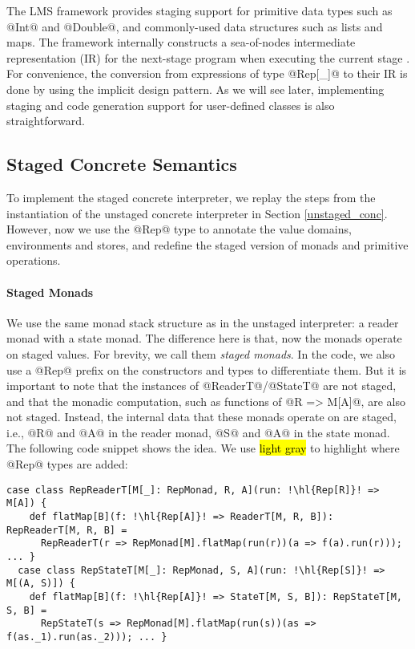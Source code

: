 The LMS framework provides staging support for primitive data types such as
@Int@ and @Double@, and commonly-used data structures such as lists and maps.
The framework internally constructs a sea-of-nodes intermediate representation (IR)
for the next-stage program when executing the current stage \cite{DBLP:conf/birthday/Rompf16}.
For convenience, the conversion from expressions of type @Rep[_]@ to their IR
is done by using the implicit design pattern. As we will see later,
implementing staging and code generation support for user-defined classes is
also straightforward.

\subsection{Staged Concrete Semantics}

To implement the staged concrete interpreter, we replay the steps from the
instantiation of the unstaged concrete interpreter in Section \ref{unstaged_conc}.
However, now we use the @Rep@ type to annotate the value domains, environments and
stores, and redefine the staged version of monads and primitive operations.

\paragraph{Staged Monads}
We use the same monad stack structure as in the unstaged interpreter: a reader
monad with a state monad. The difference here is that, now the monads operate on
staged values.  For brevity, we call them \textit{staged monads}. In the code,
we also use a @Rep@ prefix on the constructors and types to differentiate them.
But it is important to note that the instances of @ReaderT@/@StateT@
are not staged, and that the monadic computation, such as functions of @R => M[A]@,
are also not staged. Instead, the internal data that these monads operate on are
staged, i.e., @R@ and @A@ in the reader monad, @S@ and @A@ in the state monad.
The following code snippet shows the idea. We use \hl{light gray} to highlight
where @Rep@ types are added:
\begin{lstlisting}[escapechar=!]
  case class RepReaderT[M[_]: RepMonad, R, A](run: !\hl{Rep[R]}! => M[A]) {
    def flatMap[B](f: !\hl{Rep[A]}! => ReaderT[M, R, B]): RepReaderT[M, R, B] =
      RepReaderT(r => RepMonad[M].flatMap(run(r))(a => f(a).run(r))); ... }
  case class RepStateT[M[_]: RepMonad, S, A](run: !\hl{Rep[S]}! => M[(A, S)]) {
    def flatMap[B](f: !\hl{Rep[A]}! => StateT[M, S, B]): RepStateT[M, S, B] =
      RepStateT(s => RepMonad[M].flatMap(run(s))(as => f(as._1).run(as._2))); ... }
\end{lstlisting}

